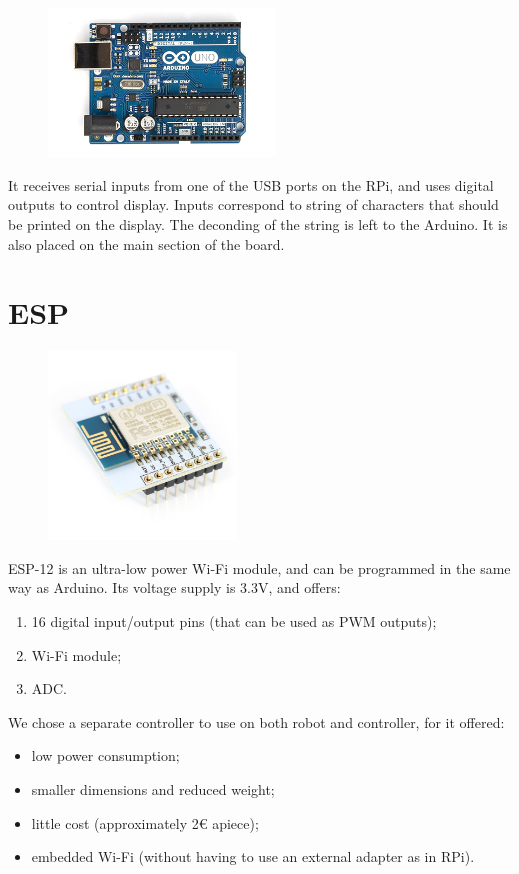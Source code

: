 \documentclass[a4paper,twoside]{book}
\begin{document}
\begin{appendices}
\begin{figure}[hb]
    \centering
    \includegraphics[width=6cm]{img/ArduinoUno}
\end{figure}

It receives serial inputs from one of the USB ports on the RPi, and uses digital outputs to control display. Inputs correspond to string of characters that should be printed on the display. The deconding of the string is left to the Arduino. 
It is also placed on the main section of the board.

\section{ESP}
\label{app:ESP}

\begin{figure}[h]
    \centering
    \includegraphics[width=5cm]{img/ESP12}
\end{figure}

\beforelist* ESP-12  is an ultra-low power Wi-Fi module, and can be programmed in the same way as Arduino. Its voltage supply is 3.3V, and offers:
\begin{enumerate}
\item 16 digital input/output pins (that can be used as PWM outputs);
\item Wi-Fi module;
\item ADC.
\end{enumerate}
\afterlist
\beforelist We chose a separate controller to use on both robot and controller, for it offered:
\begin{itemize}
\item low power consumption; 
\item smaller dimensions and reduced weight;
\item little cost (approximately 2\euro{} apiece);
\item embedded Wi-Fi (without having to use an external adapter as in RPi).
\end{itemize}
\afterlist*


\end{appendices}
\end{document}
